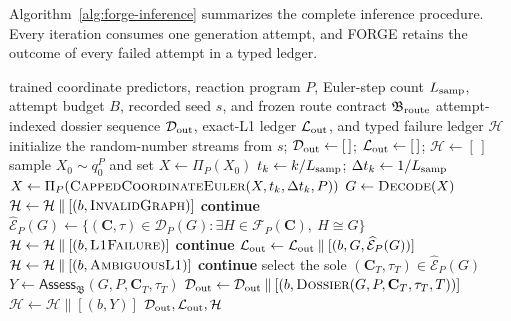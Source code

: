 \documentclass{article}
\begin{document}
Algorithm~\ref{alg:forge-inference} summarizes the complete inference procedure.
Every iteration consumes one generation attempt, and FORGE retains the outcome of every failed
attempt in a typed ledger.
\begin{algorithm}[t]
\caption{FORGE generation and fail-closed synthesis-program construction.}
\label{alg:forge-inference}
\begin{algorithmic}[1]
\Require trained coordinate predictors, reaction program $P$, Euler-step count $L_{\rm samp}$,
attempt budget $B$, recorded seed $s$, and frozen route contract $\mathfrak B_{\rm route}$
\Ensure attempt-indexed dossier sequence $\mathcal D_{\rm out}$, exact-L1 ledger $\mathcal L_{\rm out}$,
and typed failure ledger $\mathcal H$
\State initialize the random-number streams from $s$;
$\mathcal D_{\rm out}\gets[\,]$; $\mathcal L_{\rm out}\gets[\,]$; $\mathcal H\gets[\,]$
    \State sample $X_0\sim q_0^P$ and set $X\gets\Pi_P(X_0)$
        \State $t_k\gets k/L_{\rm samp}$; $\Delta t_k\gets1/L_{\rm samp}$
        \State $X\gets\Pi_P\!\left(\Call{CappedCoordinateEuler}{X,t_k,\Delta t_k,P}\right)$
    \EndFor
    \State $G\gets\Call{Decode}{X}$
        \State $\mathcal H\gets\mathcal H\mathbin{\|}[(b,\textsc{InvalidGraph})]$
        \State \textbf{continue}
    \EndIf
    \State $\widehat{\mathcal{E}}_P(G)\gets
    \{(\mathbf C,\tau)\in\mathcal D_P(G):\exists H\in\mathcal F_P(\mathbf C),\ H\cong G\}$
        \State $\mathcal H\gets\mathcal H\mathbin{\|}[(b,\textsc{L1Failure})]$
        \State \textbf{continue}
    \EndIf
    \State $\mathcal L_{\rm out}\gets\mathcal L_{\rm out}\mathbin{\|}
    [(b,G,\widehat{\mathcal E}_P(G))]$
        \State $\mathcal H\gets\mathcal H\mathbin{\|}[(b,\textsc{AmbiguousL1})]$
        \State \textbf{continue}
    \EndIf
    \State select the sole $(\mathbf C_T,\tau_T)\in\widehat{\mathcal E}_P(G)$
    \State $Y\gets\mathsf{Assess}_{\mathfrak B}(G,P,\mathbf C_T,\tau_T)$
        \State $\mathcal D_{\rm out}\gets\mathcal D_{\rm out}\mathbin{\|}
        [(b,\Call{Dossier}{G,P,\mathbf C_T,\tau_T,T})]$
    \Else
        \State $\mathcal H\gets\mathcal H\mathbin{\|}[(b,Y)]$ 
    \EndIf
\EndFor
\State \Return $\mathcal D_{\rm out},\mathcal L_{\rm out},\mathcal H$
\end{algorithmic}
\end{algorithm}
\end{document}
